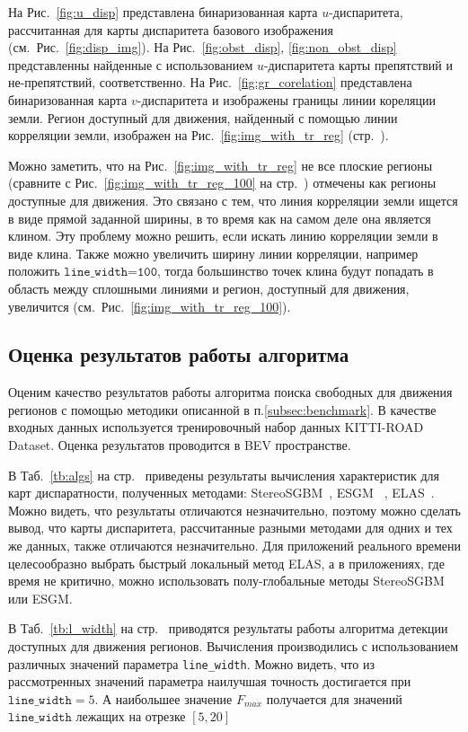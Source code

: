 \documentclass[oneside,final,12pt]{scrartcl}
\begin{document}
			На Рис.~\ref{fig:u_disp} представлена бинаризованная карта \(u\)-диспаритета, рассчитанная для карты диспаритета базового изображения (см.~Рис.~\ref{fig:disp_img}).
			На Рис.~\ref{fig:obst_disp}, \ref{fig:non_obst_disp} представленны найденные с использованием \(u\)-диспаритета карты препятствий и не-препятствий, соответственно.
			На Рис.~\ref{fig:gr_corelation} представлена бинаризованная карта \(v\)-диспаритета и изображены границы линии кореляции земли.
			Регион доступный для движения, найденный с помощью линии корреляции земли, изображен на Рис.~\ref{fig:img_with_tr_reg} (стр.~\pageref{fig:img_with_tr_reg}).

			Можно заметить, что на Рис.~\ref{fig:img_with_tr_reg} не все плоские регионы (сравните с Рис.~\ref{fig:img_with_tr_reg_100} на стр.~\pageref{fig:img_with_tr_reg_100}) отмечены как регионы доступные для движения.
			Это связано с тем, что линия корреляции земли ищется в виде прямой заданной ширины, в то время как на самом деле она является клином. Эту проблему можно решить, если искать линию корреляции земли в виде клина. Также можно увеличить ширину линии корреляции, например положить \(\texttt{line\_width=100}\), тогда большинство точек клина будут попадать в область между сплошными линиями и регион, доступный для движения, увеличится (см.~Рис.~\ref{fig:img_with_tr_reg_100}).

		\subsection{Оценка результатов работы алгоритма }
			Оценим качество результатов работы алгоритма поиска свободных для движения регионов с помощью методики описанной в п.\ref{subsec:benchmark}. В качестве входных данных используется тренировочный набор данных KITTI-ROAD Dataset. Оценка результатов проводится в BEV пространстве.

			В Таб.~\ref{tb:algs} на стр.~\pageref{tb:algs} приведены результаты вычисления характеристик для карт диспаратности, полученных методами: StereoSGBM~\cite{Hirschmuller2008}, ESGM~ \cite{Hirschmuller2005}, ELAS~\cite{Geiger2010}. Можно видеть, что результаты отличаются незначительно, поэтому можно сделать вывод, что карты диспаритета, рассчитанные разными методами для одних и тех же данных, также отличаются незначительно. Для приложений реального времени целесообразно выбрать быстрый локальный метод ELAS, а в приложениях, где время не критично, можно использовать полу-глобальные методы StereoSGBM или ESGM.

			В Таб.~\ref{tb:l_width} на стр.~\pageref{tb:l_width} приводятся результаты работы алгоритма детекции доступных для движения регионов. Вычисления производились с использованием различных значений параметра \texttt{line\_width}.
			Можно видеть, что из рассмотренных значений параметра наилучшая точность достигается при \(\texttt{line\_width}=5\).
			А наибольшее значение \(F_{max}\) получается для значений \(\texttt{line\_width}\) лежащих на отрезке \(\left[5,20\right]\)
\end{document}
